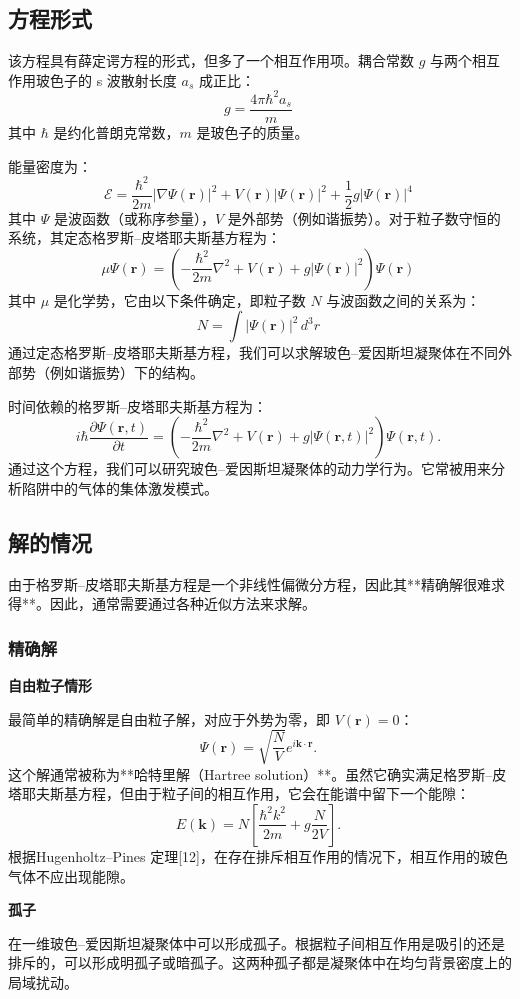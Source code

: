 \subsection{方程形式}
该方程具有薛定谔方程的形式，但多了一个相互作用项。耦合常数 $g$ 与两个相互作用玻色子的 s 波散射长度 $a_s$ 成正比：
$$
g = \frac{4\pi \hbar^2 a_s}{m}~
$$
其中 $\hbar$ 是约化普朗克常数，$m$ 是玻色子的质量。

能量密度为：
$$
\mathcal{E} = \frac{\hbar^2}{2m} |\nabla \Psi(\mathbf{r})|^2 + V(\mathbf{r}) |\Psi(\mathbf{r})|^2 + \frac{1}{2} g |\Psi(\mathbf{r})|^4~
$$
其中 $\Psi$ 是波函数（或称序参量），$V$ 是外部势（例如谐振势）。对于粒子数守恒的系统，其定态格罗斯–皮塔耶夫斯基方程为：
$$
\mu \Psi(\mathbf{r}) = \left( -\frac{\hbar^2}{2m} \nabla^2 + V(\mathbf{r}) + g |\Psi(\mathbf{r})|^2 \right) \Psi(\mathbf{r})~
$$
其中 $\mu$ 是化学势，它由以下条件确定，即粒子数 $N$ 与波函数之间的关系为：
$$
N = \int |\Psi(\mathbf{r})|^2 \, d^3 r~
$$
通过定态格罗斯–皮塔耶夫斯基方程，我们可以求解玻色–爱因斯坦凝聚体在不同外部势（例如谐振势）下的结构。

时间依赖的格罗斯–皮塔耶夫斯基方程为：
$$
i\hbar \frac{\partial \Psi(\mathbf{r}, t)}{\partial t} = \left( -\frac{\hbar^2}{2m} \nabla^2 + V(\mathbf{r}) + g |\Psi(\mathbf{r}, t)|^2 \right) \Psi(\mathbf{r}, t).~
$$
通过这个方程，我们可以研究玻色–爱因斯坦凝聚体的动力学行为。它常被用来分析陷阱中的气体的集体激发模式。
\subsection{解的情况}
由于格罗斯–皮塔耶夫斯基方程是一个非线性偏微分方程，因此其**精确解很难求得**。因此，通常需要通过各种近似方法来求解。
\subsubsection{精确解}
\textbf{自由粒子情形}

最简单的精确解是自由粒子解，对应于外势为零，即 $V(\mathbf{r}) = 0$：
$$
\Psi(\mathbf{r}) = \sqrt{\frac{N}{V}} e^{i\mathbf{k} \cdot \mathbf{r}}.~
$$
这个解通常被称为**哈特里解（Hartree solution）**。虽然它确实满足格罗斯–皮塔耶夫斯基方程，但由于粒子间的相互作用，它会在能谱中留下一个能隙：
$$
E(\mathbf{k}) = N\left[ \frac{\hbar^2 k^2}{2m} + g \frac{N}{2V} \right].~
$$
根据Hugenholtz–Pines 定理[12]，在存在排斥相互作用的情况下，相互作用的玻色气体不应出现能隙。

\textbf{孤子}

在一维玻色–爱因斯坦凝聚体中可以形成孤子。根据粒子间相互作用是吸引的还是排斥的，可以形成明孤子或暗孤子。这两种孤子都是凝聚体中在均匀背景密度上的局域扰动。


